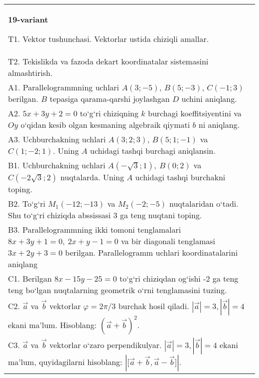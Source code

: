 \documentclass{article}
\begin{document}
\begin{tabular}{m{17cm}}
\textbf{19-variant}

T1. 
Vektor tushunchasi. Vektorlar ustida chiziqli amallar.
 \\
T2. 
Tekislikda va fazoda dekart koordinatalar sistemasini almashtirish.
 \\
A1. 
Parallelogrammning uchlari
$A (3;-5) $, $B (5;-3) $, $C (-1;3) $ berilgan. $B$ tepasiga
qarama-qarshi joylashgan $D$ uchini aniqlang.
 \\
A2. 
$5x+3y+2=0$ to‘g‘ri chiziqning $k$ burchagi
koeffitsiyentini va $Oy$ o‘qidan kesib olgan kesmaning algebraik
qiymati $b$ ni aniqlang.
 \\
A3. 
Uchburchakning uchlari
$A (3;2; 3) $, $B (5;1; - 1) $ va $C (1; -2;1) $. Uning $A$ uchidagi tashqi burchagi aniqlansin.
 \\
B1. 
Uchburchakning uchlari
\(A\left(-\sqrt{3};1 \right),\ B (0;2) \) va
\(C\left(-2\sqrt{3};2 \right) \) nuqtalarda. Uning $A$
uchidagi tashqi burchakni toping.
 \\
B2. 
To‘g‘ri \(M_{1} (-12;-13) \) va \(M_{2} (-2;-5) \)
nuqtalaridan o‘tadi. Shu to‘g‘ri chiziqda abssissasi 3 ga teng nuqtani toping.
 \\
B3. 
Parallelogrammning ikki tomoni tenglamalari
\(8x+3y+1=0,\ 2x+y-1=0\) va bir diagonali tenglamasi
\(3x+2y+3=0\) berilgan. Parallelogramm uchlari koordinatalarini
aniqlang
 \\
C1. 
Berilgan \(8x-15y-25=0\) to‘g‘ri chiziqdan og‘ishi -2 ga teng
teng bo‘lgan nuqtalarning geometrik o‘rni tenglamasini tuzing.
 \\
C2. 
$\vec{a}$ va $\vec{b}$ vektorlar $\varphi = 2\pi/3$ burchak hosil qiladi. $|\vec{a}| = 3,|\vec{b}| = 4$ ekani ma’lum. Hisoblang:
$ (\vec{a} + \vec{b}) ^{2}$.
 \\
C3. 
$\vec{a}$ va $\vec{b}$ vektorlar o‘zaro perpendikulyar. $|\vec{a}| = 3,|\vec{b}| = 4$ ekani ma’lum, quyidagilarni hisoblang:
$|\lbrack\vec{a} + \vec{b},\vec{a} - \vec{b}\rbrack|$.
 \\

\end{tabular}
\vspace{1cm}
\end{document}
